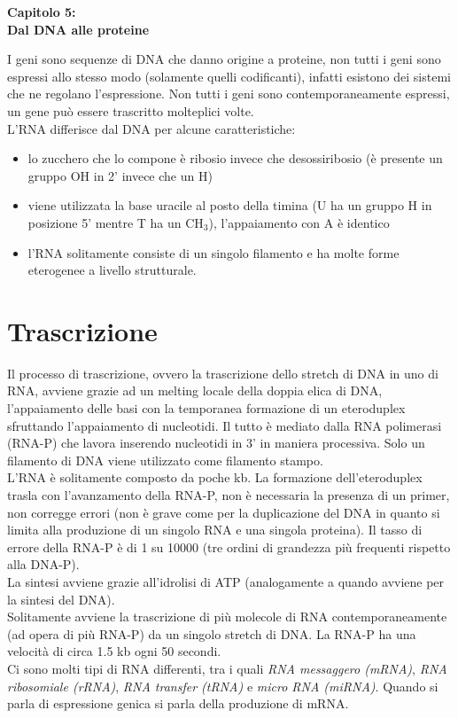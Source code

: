 \Huge\textbf{Capitolo 5: \\Dal DNA alle proteine}

\vspace{1cm}
\small
I geni sono sequenze di DNA che danno origine a proteine, non tutti i geni sono espressi allo stesso modo (solamente quelli codificanti), infatti esistono dei sistemi che ne regolano l'espressione. 
Non tutti i geni sono contemporaneamente espressi, un gene può essere trascritto molteplici volte.\\
L'RNA differisce dal DNA per alcune caratteristiche:
\begin{itemize}
    \item lo zucchero che lo compone è ribosio invece che desossiribosio (è presente un gruppo OH in 2' invece che un H)
    \item viene utilizzata la base uracile al posto della timina (U ha un gruppo H in posizione 5' mentre T ha un CH$_ {3}$), l'appaiamento con A è identico
    \item l'RNA solitamente consiste di un singolo filamento e ha molte forme eterogenee a livello strutturale. 
\end{itemize}

\section{Trascrizione}
    Il processo di trascrizione, ovvero la trascrizione dello stretch di DNA in uno di RNA, avviene grazie ad un melting locale della doppia elica di DNA, l'appaiamento delle basi con la temporanea formazione di un eteroduplex sfruttando l'appaiamento di nucleotidi. 
    Il tutto è mediato dalla RNA polimerasi (RNA-P) che lavora inserendo nucleotidi in 3' in maniera processiva. Solo un filamento di DNA viene utilizzato come filamento stampo.\\
    L'RNA è solitamente composto da poche kb. La formazione dell'eteroduplex trasla con l'avanzamento della RNA-P, non è necessaria la presenza di un primer, non corregge errori (non è grave come per la duplicazione del DNA in quanto si limita alla produzione di un singolo RNA e una singola proteina). 
    Il tasso di errore della RNA-P è di 1 su 10000 (tre ordini di grandezza più frequenti rispetto alla DNA-P).\\
    La sintesi avviene grazie all'idrolisi di ATP (analogamente a quando avviene per la sintesi del DNA).\\
    Solitamente avviene la trascrizione di più molecole di RNA contemporaneamente (ad opera di più RNA-P) da un singolo stretch di DNA. La RNA-P ha una velocità di circa 1.5 kb ogni 50 secondi.\\
    Ci sono molti tipi di RNA differenti, tra i quali \textit{RNA messaggero (mRNA)}, \textit{RNA ribosomiale (rRNA)}, \textit{RNA transfer (tRNA)} e \textit{micro RNA (miRNA)}. Quando si parla di espressione genica si parla della produzione di mRNA.
    
